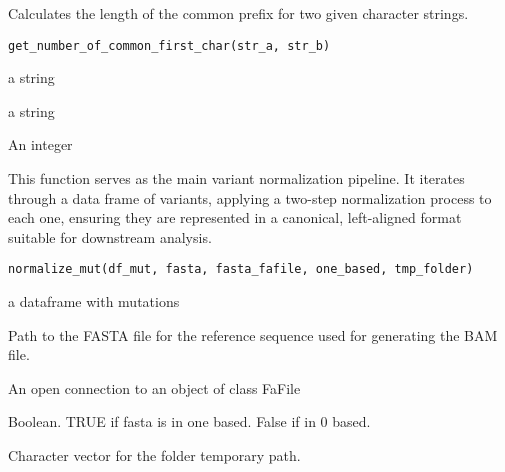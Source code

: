 \documentclass[a4paper]{book}
\begin{document}
%
\begin{Description}
Calculates the length of the common prefix for two given character strings.
\end{Description}
%
\begin{Usage}
\begin{verbatim}
get_number_of_common_first_char(str_a, str_b)
\end{verbatim}
\end{Usage}
%
\begin{Arguments}
\begin{ldescription}
\item[\code{str\_a}] a string

\item[\code{str\_b}] a string
\end{ldescription}
\end{Arguments}
%
\begin{Value}
An integer
\end{Value}
%
\begin{Description}
This function serves as the main variant normalization pipeline. It iterates through a data frame of variants,
applying a two-step normalization process to each one, ensuring they are represented in a canonical, left-aligned
format suitable for downstream analysis.
\end{Description}
%
\begin{Usage}
\begin{verbatim}
normalize_mut(df_mut, fasta, fasta_fafile, one_based, tmp_folder)
\end{verbatim}
\end{Usage}
%
\begin{Arguments}
\begin{ldescription}
\item[\code{df\_mut}] a dataframe with mutations

\item[\code{fasta}] Path to the FASTA file for the reference sequence used for generating the BAM file.

\item[\code{fasta\_fafile}] An open connection to an object of class FaFile

\item[\code{one\_based}] Boolean. TRUE if fasta is in one based. False if in 0 based.

\item[\code{tmp\_folder}] Character vector for the folder temporary path.
\end{ldescription}
\end{Arguments}
\end{document}
